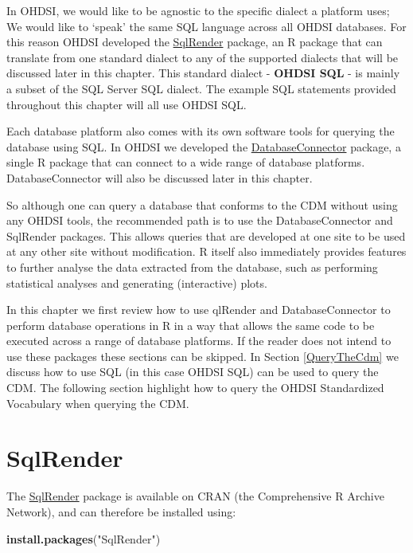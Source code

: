 \documentclass[]{book}
\newenvironment{Shaded}{\begin{snugshade}}{\end{snugshade}}
\newcommand{\KeywordTok}[1]{\textcolor[rgb]{0.13,0.29,0.53}{\textbf{#1}}}
\newcommand{\StringTok}[1]{\textcolor[rgb]{0.31,0.60,0.02}{#1}}
\newcommand{\NormalTok}[1]{#1}
\begin{document}
In OHDSI, we would like to be agnostic to the specific dialect a
platform uses; We would like to `speak' the same SQL language across all
OHDSI databases. For this reason OHDSI developed the
\href{https://ohdsi.github.io/SqlRender/}{SqlRender} package, an R
package that can translate from one standard dialect to any of the
supported dialects that will be discussed later in this chapter. This
standard dialect - \textbf{OHDSI SQL} - is mainly a subset of the SQL
Server SQL dialect. The example SQL statements provided throughout this
chapter will all use OHDSI SQL.

Each database platform also comes with its own software tools for
querying the database using SQL. In OHDSI we developed the
\href{https://ohdsi.github.io/DatabaseConnector/}{DatabaseConnector}
package, a single R package that can connect to a wide range of database
platforms. DatabaseConnector will also be discussed later in this
chapter.

So although one can query a database that conforms to the CDM without
using any OHDSI tools, the recommended path is to use the
DatabaseConnector and SqlRender packages. This allows queries that are
developed at one site to be used at any other site without modification.
R itself also immediately provides features to further analyse the data
extracted from the database, such as performing statistical analyses and
generating (interactive) plots.

In this chapter we first review how to use qlRender and
DatabaseConnector to perform database operations in R in a way that
allows the same code to be executed across a range of database
platforms. If the reader does not intend to use these packages these
sections can be skipped. In Section \ref{QueryTheCdm} we discuss how to
use SQL (in this case OHDSI SQL) can be used to query the CDM. The
following section highlight how to query the OHDSI Standardized
Vocabulary when querying the CDM.

\section{SqlRender}\label{SqlRender}

The \href{https://ohdsi.github.io/SqlRender/}{SqlRender} package is
available on CRAN (the Comprehensive R Archive Network), and can
therefore be installed using:

\begin{Shaded}
\begin{Highlighting}[]
\KeywordTok{install.packages}\NormalTok{(}\StringTok{"SqlRender"}\NormalTok{)}
\end{Highlighting}
\end{Shaded}
\end{document}
